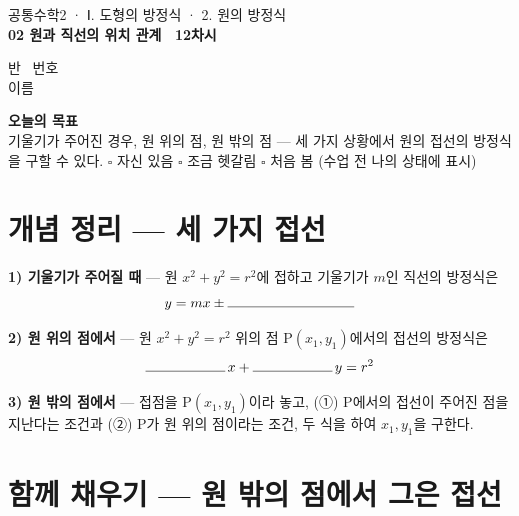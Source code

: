\documentclass[11pt,a4paper]{article}
\newcommand{\fillblank}[1]{\makebox[#1]{\hrulefill}}
\begin{document}
\noindent
\begin{minipage}[b]{0.62\linewidth}
  {\sffamily\footnotesize\color{indigosoft} 공통수학2 · Ⅰ. 도형의 방정식 · 2. 원의 방정식}\\[2pt]
  {\sffamily\bfseries\Large 02 원과 직선의 위치 관계 \textperiodcentered\ 12차시}
\end{minipage}\hfill
\begin{minipage}[b]{0.36\linewidth}
  \raggedleft\small\color{inksoft}
  반\ \fillblank{1.6cm} \quad 번호\ \fillblank{1.6cm}\\[4pt]
  이름\ \fillblank{3.6cm}
\end{minipage}

\vspace{4pt}
\noindent{\color{goldc}\rule{\linewidth}{2.2pt}}
\vspace{10pt}

\begin{goalbox}
\textbf{오늘의 목표}\\
기울기가 주어진 경우, 원 위의 점, 원 밖의 점 --- 세 가지 상황에서 원의 접선의 방정식을 구할 수 있다.
\vspace{4pt}
\small\color{inksoft}
$\square$ 자신 있음 \quad $\square$ 조금 헷갈림 \quad $\square$ 처음 봄 \hfill (수업 전 나의 상태에 표시)
\end{goalbox}

\section{개념 정리 --- 세 가지 접선}

\begin{sheetbox}
\textbf{1) 기울기가 주어질 때} --- 원 $x^2+y^2=r^2$에 접하고 기울기가 $m$인 직선의 방정식은
\[
y = mx \pm \fillblank{3.2cm}
\]

\vspace{6pt}
\textbf{2) 원 위의 점에서} --- 원 $x^2+y^2=r^2$ 위의 점 P$(x_1,y_1)$에서의 접선의 방정식은
\[
\fillblank{2cm}\,x + \fillblank{2cm}\,y = r^2
\]

\vspace{6pt}
\textbf{3) 원 밖의 점에서} --- 접점을 P$(x_1,y_1)$이라 놓고, (①) P에서의 접선이 주어진 점을 지난다는 조건과 (②) P가 원 위의 점이라는 조건, 두 식을 \fillblank{3.2cm}하여 $x_1,y_1$을 구한다.
\end{sheetbox}

\section{함께 채우기 --- 원 밖의 점에서 그은 접선}
\end{document}
